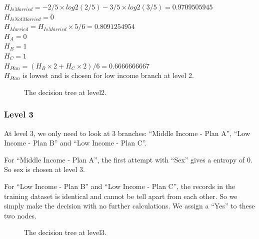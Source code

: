 \documentclass[12pt]{article}
\begin{document}
$H_{IsMarried} = - 2/5 × log2(2/5) - 3/5 × log2(3/5) = 0.9709505945$\\
$H_{IsNotMarried} = 0$\\
$H_{Married} = H_{IsMarried} × 5/6 = 0.8091254954$\\

$H_{A} = 0$\\
$H_{B} = 1$\\
$H_{C} = 1$\\
$H_{Plan} = (H_{B} × 2 + H_{C} × 2)/6 = 0.6666666667$\\

$H_{Plan}$ is lowest and is chosen for low income branch at level 2.

\begin{figure}[!ht]
\begin{center}
\sf\footnotesize
{}
\end{center}
\caption{The decision tree at level2.}
\label{fig:tree-level2}
\end{figure}

\subsubsection{Level 3}
At level 3, we only need to look at 3 branches: ``Middle Income - Plan A'', ``Low Income - Plan B'' and ``Low Income - Plan C''.

For ``Middle Income - Plan A'', the first attempt with ``Sex'' gives a entropy of 0. So sex is chosen at level 3.

For ``Low Income - Plan B'' and ``Low Income - Plan C'', the records in the training dataset is identical and cannot be tell apart from each other. So we simply make the decision with no further calculations. We assign a ``Yes'' to these two nodes.

\begin{figure}[!ht]
\begin{center}
\sf\footnotesize
{}
\end{center}
\caption{The decision tree at level3.}
\label{fig:tree-level3}
\end{figure}
\end{document}
